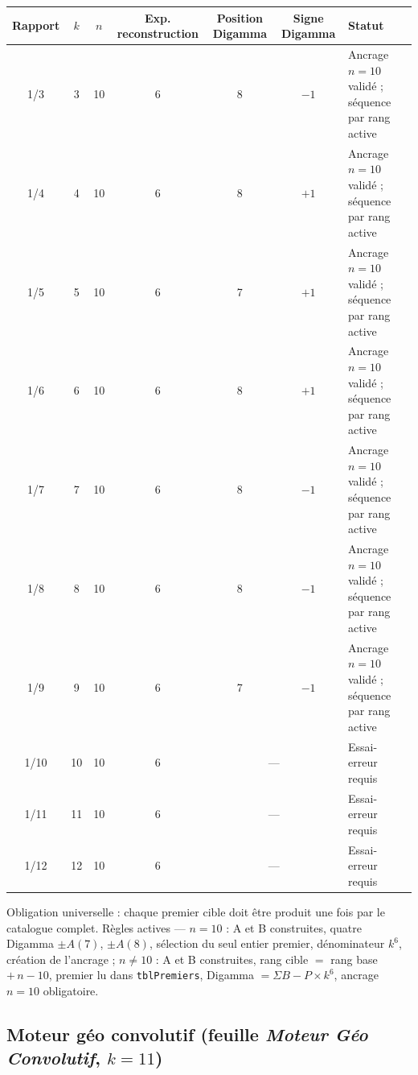 \documentclass[11pt,a4paper]{article}
\begin{document}
\begin{center}\scriptsize
\setlength{\tabcolsep}{2pt}
\begin{tabular}{@{}c c c c c c l@{}}
\toprule
\rowcolor{spectralgris}
Rapport & $k$ & $n$ & Exp. reconstruction & Position Digamma & Signe Digamma & Statut \\
\midrule
1/3 & 3 & 10 & 6 & 8 & $-1$ & Ancrage $n=10$ validé ; séquence par rang active \\
1/4 & 4 & 10 & 6 & 8 & $+1$ & Ancrage $n=10$ validé ; séquence par rang active \\
1/5 & 5 & 10 & 6 & 7 & $+1$ & Ancrage $n=10$ validé ; séquence par rang active \\
1/6 & 6 & 10 & 6 & 8 & $+1$ & Ancrage $n=10$ validé ; séquence par rang active \\
1/7 & 7 & 10 & 6 & 8 & $-1$ & Ancrage $n=10$ validé ; séquence par rang active \\
1/8 & 8 & 10 & 6 & 8 & $-1$ & Ancrage $n=10$ validé ; séquence par rang active \\
1/9 & 9 & 10 & 6 & 7 & $-1$ & Ancrage $n=10$ validé ; séquence par rang active \\
1/10 & 10 & 10 & 6 & \multicolumn{2}{c}{---} & Essai-erreur requis \\
1/11 & 11 & 10 & 6 & \multicolumn{2}{c}{---} & Essai-erreur requis \\
1/12 & 12 & 10 & 6 & \multicolumn{2}{c}{---} & Essai-erreur requis \\
\bottomrule
\end{tabular}
\end{center}

Obligation universelle : chaque premier cible doit être produit une fois par le
catalogue complet. Règles actives --- $n = 10$ : A et B construites, quatre
Digamma $\pm A(7)$, $\pm A(8)$, sélection du seul entier premier, dénominateur
$k^{6}$, création de l'ancrage ; $n \neq 10$ : A et B construites, rang cible
$=$ rang base $+\,n-10$, premier lu dans \texttt{tblPremiers}, Digamma $= \Sigma B
- P \times k^{6}$, ancrage $n=10$ obligatoire.

\subsection{Moteur géo convolutif (feuille \emph{Moteur Géo Convolutif}, $k = 11$)}
\end{document}
